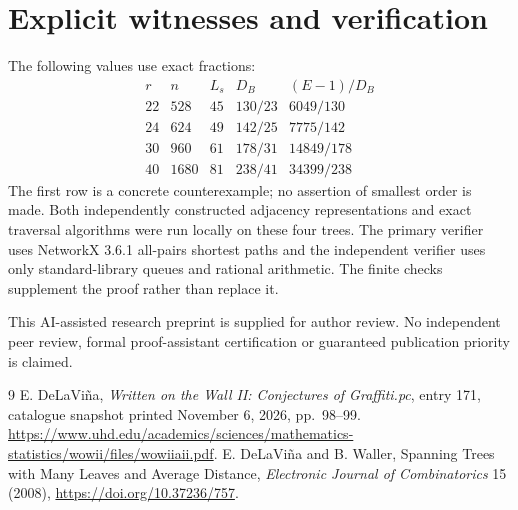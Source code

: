 \documentclass[11pt]{article}
\begin{document}
\section{Explicit witnesses and verification}
The following values use exact fractions:
\[
\begin{array}{r|r|r|r|r}
r& n& L_s & D_B & (E-1)/D_B\\\hline
22&528&45&130/23&6049/130\\
24&624&49&142/25&7775/142\\
30&960&61&178/31&14849/178\\
40&1680&81&238/41&34399/238
\end{array}
\]
The first row is a concrete counterexample; no assertion of smallest order is made. Both independently constructed adjacency representations and exact traversal algorithms were run locally on these four trees. The primary verifier uses NetworkX 3.6.1 all-pairs shortest paths and the independent verifier uses only standard-library queues and rational arithmetic. The finite checks supplement the proof rather than replace it.

This AI-assisted research preprint is supplied for author review. No independent peer review, formal proof-assistant certification or guaranteed publication priority is claimed.
\begin{thebibliography}{9}
 E. DeLaVi\~na, \emph{Written on the Wall II: Conjectures of Graffiti.pc}, entry 171, catalogue snapshot printed November 6, 2026, pp.~98--99. \url{https://www.uhd.edu/academics/sciences/mathematics-statistics/wowii/files/wowiiaii.pdf}.
 E. DeLaVi\~na and B. Waller, Spanning Trees with Many Leaves and Average Distance, \emph{Electronic Journal of Combinatorics} 15 (2008), \url{https://doi.org/10.37236/757}.
\end{thebibliography}
\end{document}
